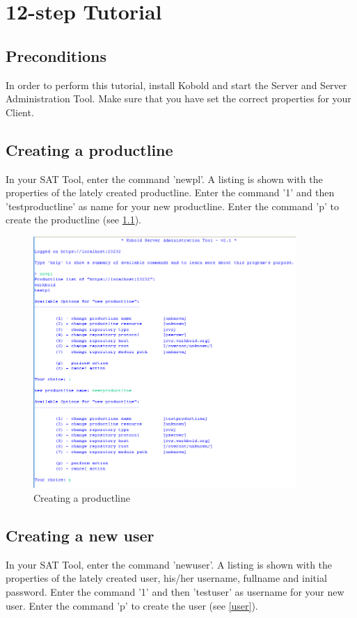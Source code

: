 \chapter{12-step Tutorial}

\section{Preconditions}
In order to perform this tutorial, install Kobold and start the Server and
Server Administration Tool. Make sure that you have set the correct properties for your
Client. 


\section{Creating a productline}
In your SAT Tool, enter the command 'newpl'. A listing is shown with the properties of the lately created
productline. Enter the command '1' and then 'testproductline' as name for your
new productline. Enter the command 'p' to create the productline (see \ref{productline}).

\begin{figure}[h!]
\begin{center}
\includegraphics[width=10cm]{tutorial1.png}
   \caption{Creating a productline}
   \label{productline}
\end{center}
\end{figure}\par


\section{Creating a new user}
In your SAT Tool, enter the command 'newuser'. A listing is shown with the properties of the lately created
user, his/her username, fullname and initial password. 
Enter the command '1' and then 'testuser' as username for your new user.
Enter the command 'p' to create the user (see \ref{user}).

